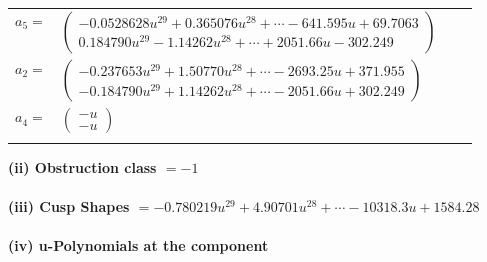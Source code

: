 \documentclass[1p]{elsarticle_modified}
\theoremstyle{definition}
\begin{document}
\begin{tabular}{m{7pt} m{180pt} m{7pt} m{180pt} }
\flushright $a_{5}=$&$\begin{pmatrix}-0.0528628 u^{29}+0.365076 u^{28}+\cdots-641.595 u+69.7063\\0.184790 u^{29}-1.14262 u^{28}+\cdots+2051.66 u-302.249\end{pmatrix}$ \\
\flushright $a_{2}=$&$\begin{pmatrix}-0.237653 u^{29}+1.50770 u^{28}+\cdots-2693.25 u+371.955\\-0.184790 u^{29}+1.14262 u^{28}+\cdots-2051.66 u+302.249\end{pmatrix}$ \\
\flushright $a_{4}=$&$\begin{pmatrix}- u\\- u\end{pmatrix}$\\&\end{tabular}
\flushleft \textbf{(ii) Obstruction class $= -1$}\\~\\
\flushleft \textbf{(iii) Cusp Shapes $= -0.780219 u^{29}+4.90701 u^{28}+\cdots-10318.3 u+1584.28$}\\~\\
\newpage\renewcommand{\arraystretch}{1}
\flushleft \textbf{(iv) u-Polynomials at the component}\newline \\
\end{document}

